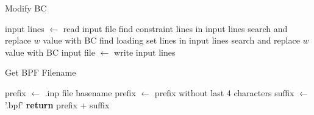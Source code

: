 \begin{algorithm}[tbp]
  \caption{Modify BC}
  \label{alg:modify_bc}
  \begin{algorithmic}
    \State input lines $\gets$ read input file
      \State find constraint lines in input lines
          \State search and replace \(w\) value with BC
        \EndIf
      \EndFor
    \Else {}
      \State find loading set lines in input lines
          \State search and replace \(w\) value with BC
        \EndIf
      \EndFor
    \EndIf
    \State input file $\gets$ write input lines
    \EndProcedure
  \end{algorithmic}
\end{algorithm}

\begin{algorithm}[tbp]
  \caption{Get BPF Filename}
  \label{alg:get_bpf_filename}
  \begin{algorithmic}
      \State prefix $\gets$ .inp file basename 
      \State prefix $\gets$ prefix without last 4 characters 
      \State suffix $\gets$ '.bpf'
      \State \textbf{return} prefix + suffix 
    \EndProcedure
  \end{algorithmic}
\end{algorithm}

